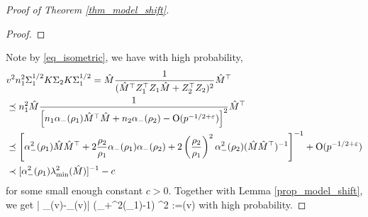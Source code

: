 \begin{proof}[Proof of Theorem \ref{thm_model_shift}]
\begin{proof}
\end{proof}
Note by \eqref{eq_isometric}, we have with high probability,
\begin{align*}
&v^2 n_1^2 \Sigma_1^{1/2} K \Sigma_2 K \Sigma_1^{1/2} = \hat M\frac{1}{(\hat M^\top Z_1^\top Z_1 \hat M + Z_2^\top Z_2)^2}\hat M^\top \\
&\preceq  n_1^2 \hat M\frac{1}{\left[n_1 \alpha_-(\rho_1)\hat M^\top \hat M + n_2 \alpha_-(\rho_2) - \operatorname{O}(p^{-1/2+{\varepsilon}})\right]^2}\hat M^\top \\
&\preceq  \left[ \alpha_-^2(\rho_1) \hat M\hat M^\top + 2\frac{\rho_2}{\rho_1} \alpha_-(\rho_1)\alpha_-(\rho_2) + 2\left(\frac{\rho_2}{\rho_1}\right)^2 \alpha_-^2(\rho_2) (\hat M \hat M^\top )^{-1}\right]^{-1}+  \operatorname{O}(p^{-1/2+{\varepsilon}}) \\
&\prec [\alpha_-^2(\rho_1) \lambda_{\min}^2(\hat M)]^{-1} - c
\end{align*}
for some small enough constant $c>0$. Together with Lemma \ref{prop_model_shift}, we get
\be\label{bounddelta-}
\left| \delta_\beta(v)-\wt\delta_\beta(v)\right| 
		\le (\al_+^2(\rho_1)-1) \cdot {}^2 :=\delta(v)
\ee
with high probability.


\end{proof}
